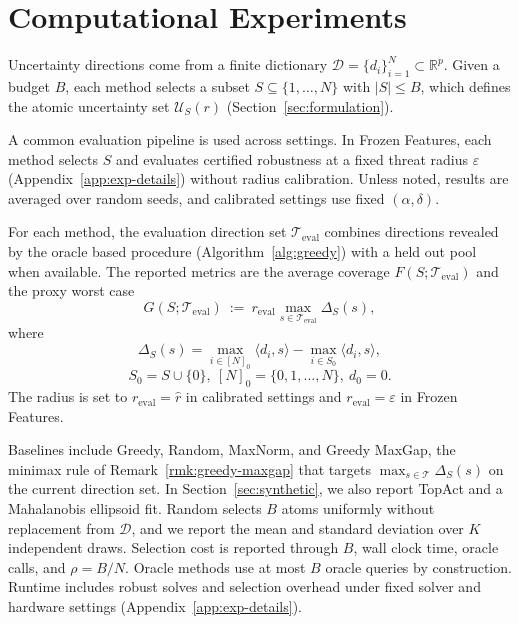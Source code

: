 \documentclass[accepted]{uai2026}
\theoremstyle{plain}
\theoremstyle{definition}
\theoremstyle{remark}
\begin{document}
\section{Computational Experiments}
\label{sec:computational_exp}

Uncertainty directions come from a finite dictionary $\mathcal{D}=\{d_i\}_{i=1}^N \subset \mathbb{R}^p$. Given a budget $B$, each method selects a subset $S \subseteq \{1,\dots,N\}$ with $|S|\le B$, which defines the atomic uncertainty set $\mathcal{U}_S(r)$ (Section~\ref{sec:formulation}).

A common evaluation pipeline is used across settings. 
In Frozen Features, each method selects $S$ and evaluates certified robustness at a fixed threat radius $\varepsilon$ (Appendix~\ref{app:exp-details}) without radius calibration. Unless noted, results are averaged over random seeds, and calibrated settings use fixed $(\alpha,\delta)$.

For each method, the evaluation direction set $\mathcal{T}_{\mathrm{eval}}$ combines directions revealed by the oracle based procedure (Algorithm~\ref{alg:greedy}) with a held out pool when available. The reported metrics are the average coverage $F(S;\mathcal{T}_{\mathrm{eval}})$ and the proxy worst case
\[
G(S;\mathcal{T}_{\mathrm{eval}})\ :=\ r_{\mathrm{eval}} \max_{s\in\mathcal{T}_{\mathrm{eval}}}\Delta_S(s),
\]
where
\[
\Delta_S(s)=\max_{i\in[N]_0}\langle d_i,s\rangle-\max_{i\in S_0}\langle d_i,s\rangle,
\]
\[
S_0=S\cup\{0\},\ [N]_0=\{0,1,\dots,N\},\ d_0=0.
\]
The radius is set to $r_{\mathrm{eval}}=\widehat r$ in calibrated settings and $r_{\mathrm{eval}}=\varepsilon$ in Frozen Features.

Baselines include Greedy, Random, MaxNorm, and Greedy MaxGap, the minimax rule of Remark~\ref{rmk:greedy-maxgap} that targets $\max_{s\in\mathcal{T}}\Delta_S(s)$ on the current direction set. In Section~\ref{sec:synthetic}, we also report TopAct and a Mahalanobis ellipsoid fit. Random selects $B$ atoms uniformly without replacement from $\mathcal{D}$, and we report the mean and standard deviation over $K$ independent draws. Selection cost is reported through $B$, wall clock time, oracle calls, and $\rho=B/N$. Oracle methods use at most $B$ oracle queries by construction. Runtime includes robust solves and selection overhead under fixed solver and hardware settings (Appendix~\ref{app:exp-details}).
\end{document}
